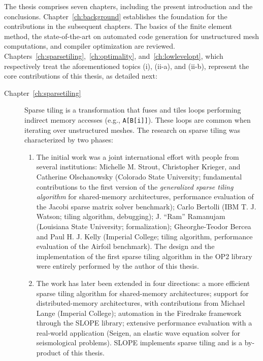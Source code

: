 The thesis comprises seven chapters, including the present introduction and the conclusions. Chapter~\ref{ch:background} establishes the foundation for the contributions in the subsequent chapters. The basics of the finite element method, the state-of-the-art on automated code generation for unstructured mesh computations, and compiler optimization are reviewed. Chapters~\ref{ch:sparsetiling},~\ref{ch:optimality}, and~\ref{ch:lowlevelopt}, which respectively treat the aforementioned topics (i), (ii-a), and (ii-b), represent the core contributions of this thesis, as detailed next:

\begin{description}
\item[Chapter~\ref{ch:sparsetiling}] Sparse tiling is a transformation that fuses and tiles loops performing indirect memory accesses (e.g., {\tt A[B[i]]}). These loops are common when iterating over unstructured meshes. The research on sparse tiling was characterized by two phases:
\begin{enumerate}
\item The initial work was a joint international effort with people from several institutions: Michelle M. Strout, Christopher Krieger, and Catherine Olschanowsky (Colorado State University; fundamental contributions to the first version of the {\em generalized sparse tiling algorithm} for shared-memory architectures, performance evaluation of the Jacobi sparse matrix solver benchmark); Carlo Bertolli (IBM T. J. Watson; tiling algorithm, debugging); J. ``Ram'' Ramanujam (Louisiana State University; formalization); Gheorghe-Teodor Bercea and Paul H. J. Kelly (Imperial College; tiling algorithm, performance evaluation of the Airfoil benchmark). The design and the implementation of the first sparse tiling algorithm in the OP2 library were entirely performed by the author of this thesis. 
\item The work has later been extended in four directions: a more efficient sparse tiling algorithm for shared-memory architectures; support for distributed-memory architectures, with contributions from Michael Lange (Imperial College); automation in the Firedrake framework through the SLOPE library; extensive performance evaluation with a real-world application (Seigen, an elastic wave equation solver for seismological problems). SLOPE implements sparse tiling and is a by-product of this thesis.
\end{enumerate}


\end{description}
